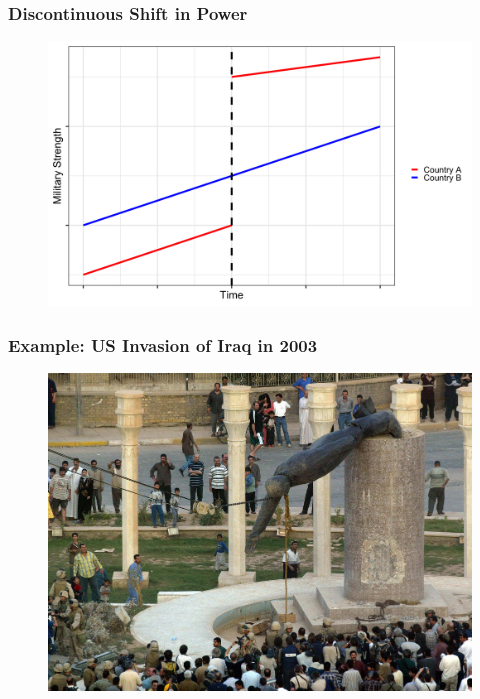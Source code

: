 \documentclass[handout]{beamer}
\begin{document}
\begin{frame} 
	\frametitle{\LARGE{Discontinuous Shift in Power}}
	\begin{figure}[ht!]
		\centering
		\includegraphics[height=.85\textheight, keepaspectratio]{./disc_jump.png}
	\end{figure}
\end{frame}

\begin{frame} 
	\frametitle{\LARGE{Example: US Invasion of Iraq in 2003}}
	\begin{figure}[ht!]
		\centering
		\includegraphics[height=.9\textheight, keepaspectratio]{Saddamstatue.jpg}
	\end{figure}
\end{frame}
\end{document}
